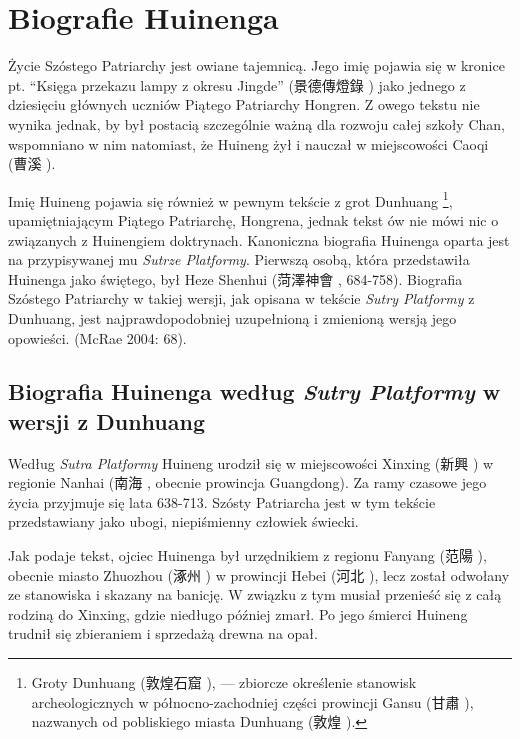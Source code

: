 \chapter{Biografie Huinenga}
Życie Szóstego Patriarchy jest owiane tajemnicą. Jego imię pojawia się w kronice pt. ``Księga przekazu lampy z okresu Jingde'' (景德傳燈錄 ) jako jednego z dziesięciu głównych uczniów Piątego Patriarchy Hongren.
Z owego tekstu nie wynika jednak, by był postacią szczególnie ważną dla rozwoju całej szkoły Chan, wspomniano w nim natomiast, że Huineng żył i nauczał w miejscowości Caoqi (曹溪 ).

Imię Huineng pojawia się również w pewnym tekście z grot Dunhuang%
\footnote{Groty Dunhuang (敦煌石窟 ), --- zbiorcze określenie stanowisk archeologicznych w północno-zachodniej części prowincji Gansu (甘肅 ), nazwanych od pobliskiego miasta Dunhuang (敦煌 ).},
upamiętniającym Piątego Patriarchę, Hongrena, jednak tekst ów nie mówi nic o związanych z Huinengiem doktrynach. Kanoniczna biografia Huinenga oparta jest na przypisywanej mu \textit{Sutrze Platformy}. Pierwszą osobą, która przedstawiła Huinenga jako świętego, był Heze Shenhui (菏澤神會 , 684-758). Biografia Szóstego Patriarchy w takiej wersji, jak opisana w tekście \textit{Sutry Platformy} z Dunhuang, jest najprawdopodobniej uzupełnioną i zmienioną wersją jego opowieści. (McRae 2004: 68).

\section{Biografia Huinenga według \textit{Sutry Platformy} w wersji z Dunhuang}
Według \textit{Sutra Platformy} Huineng urodził się w miejscowości Xinxing (新興 ) w regionie Nanhai (南海 , obecnie prowincja Guangdong). Za ramy czasowe jego życia przyjmuje się lata 638-713. Szósty Patriarcha jest w tym tekście przedstawiany jako ubogi, niepiśmienny człowiek świecki.

Jak podaje tekst, ojciec Huinenga był urzędnikiem z regionu Fanyang (范陽 ), obecnie miasto Zhuozhou (涿州 ) w prowincji Hebei (河北 ), lecz został odwołany ze stanowiska i skazany na banicję. W związku z tym musiał przenieść się z całą rodziną do Xinxing, gdzie niedługo później zmarł. Po jego śmierci Huineng trudnił się zbieraniem i sprzedażą drewna na opał.

